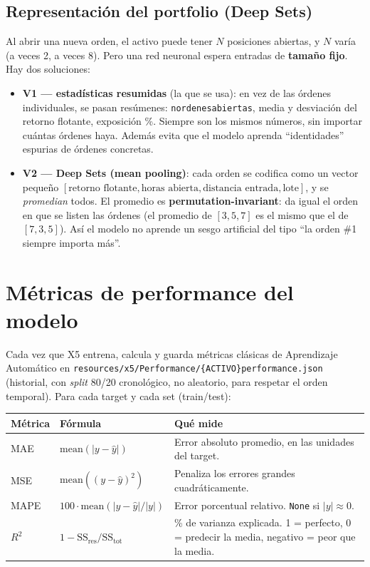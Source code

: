 \documentclass[11pt,a4paper]{report}
\newcommand{\code}[1]{\texttt{\def\_{\textunderscore\allowbreak}#1}}
\begin{document}
\section{Representación del portfolio (Deep Sets)}

Al abrir una nueva orden, el activo puede tener $N$ posiciones abiertas, y $N$ varía (a veces 2, a
veces 8). Pero una red neuronal espera entradas de \textbf{tamaño fijo}. Hay dos soluciones:

\begin{itemize}[leftmargin=1.4em]
  \item \textbf{V1 — estadísticas resumidas} (la que se usa): en vez de las órdenes individuales,
  se pasan resúmenes: \code{n\_ordenes\_abiertas}, media y desviación del retorno flotante,
  exposición \%. Siempre son los mismos números, sin importar cuántas órdenes haya. Además evita
  que el modelo aprenda ``identidades'' espurias de órdenes concretas.
  \item \textbf{V2 — Deep Sets (mean pooling)}: cada orden se codifica como un vector pequeño
  $[\text{retorno flotante}, \text{horas abierta}, \text{distancia entrada}, \text{lote}]$, y se
  \emph{promedian} todos. El promedio es \textbf{permutation-invariant}: da igual el orden en que
  se listen las órdenes (el promedio de $[3,5,7]$ es el mismo que el de $[7,3,5]$). Así el modelo
  no aprende un sesgo artificial del tipo ``la orden \#1 siempre importa más''.
\end{itemize}

\chapter{Métricas de performance del modelo}

Cada vez que X5 entrena, calcula y guarda métricas clásicas de Aprendizaje Automático en
\code{resources/x5/Performance/\{ACTIVO\}\_performance.json} (historial, con \emph{split} 80/20
cronológico, no aleatorio, para respetar el orden temporal). Para cada target y cada set
(train/test):

\begin{center}\small
\begin{tabular}{@{}llp{7.2cm}@{}}
\toprule
\textbf{Métrica} & \textbf{Fórmula} & \textbf{Qué mide} \\
\midrule
MAE & $\text{mean}(|y-\hat y|)$ & Error absoluto promedio, en las unidades del target. \\
MSE & $\text{mean}((y-\hat y)^2)$ & Penaliza los errores grandes cuadráticamente. \\
MAPE & $100\cdot\text{mean}(|y-\hat y|/|y|)$ & Error porcentual relativo. \code{None} si $|y|\approx 0$. \\
$R^2$ & $1 - \text{SS}_{\text{res}}/\text{SS}_{\text{tot}}$ & \% de varianza explicada. 1 = perfecto, 0 = predecir la media, negativo = peor que la media. \\
\bottomrule
\end{tabular}
\end{center}
\end{document}
